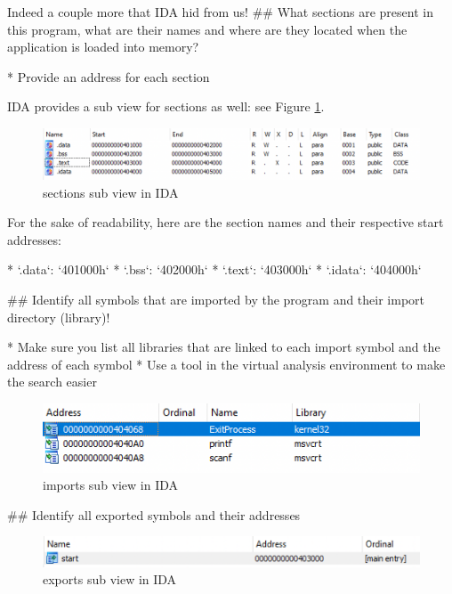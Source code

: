 \begin{markdown}

Indeed a couple more that IDA hid from us!
## What sections are present in this program, what are their names and where are they located when the application is loaded into memory?

* Provide an address for each section

\noindent\s IDA provides a sub view for sections as well: see Figure \ref{sections}.\s

\begin{figure}[!htbp]
\centering
\includegraphics[width=\linewidth]{media/sections.png}
\caption{sections sub view in IDA}\label{sections}
\end{figure}

\noindent\s For the sake of readability, here are the section names and their respective start addresses:\s

* `.data`: `401000h`
* `.bss`: `402000h`
* `.text`: `403000h`
* `.idata`: `404000h`

## Identify all symbols that are imported by the program and their import directory (library)!

* Make sure you list all libraries that are linked to each import symbol and the address of each symbol
* Use a tool in the virtual analysis environment to make the search easier

\begin{figure}[!htbp]
\centering
\includegraphics[width=\linewidth]{media/symbols.png}
\caption{imports sub view in IDA}\label{symbols}
\end{figure}

\clearpage
## Identify all exported symbols and their addresses

\begin{figure}[!htbp]
\centering
\includegraphics[width=\linewidth]{media/exports.png}
\caption{exports sub view in IDA}\label{export}
\end{figure}


\end{markdown}
